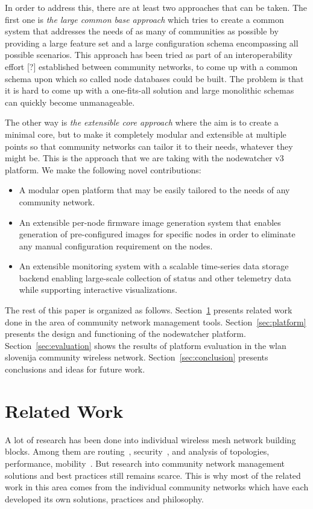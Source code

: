 \documentclass[5p,sort&compress]{elsarticle}
\begin{document}
In order to address this, there are at least two approaches that can be taken.
The first one is \textit{the large common base approach} which tries to create a common system that addresses the needs of as many of communities as possible by providing a large feature set and a large configuration schema encompassing all possible scenarios.
This approach has been tried as part of an interoperability effort [?] established between community networks, to come up with a common schema upon which so called node databases could be built.
The problem is that it is hard to come up with a one-fits-all solution and large monolithic schemas can quickly become unmanageable.

The other way is \textit{the extensible core approach} where the aim is to create a minimal core, but to make it completely modular and extensible at multiple points so that community networks can tailor it to their needs, whatever they might be.
This is the approach that we are taking with the nodewatcher v3 platform.
We make the following novel contributions:
\begin{itemize}
\item A modular open platform that may be easily tailored to the needs of any community network.
\item An extensible per-node firmware image generation system that enables generation of pre-configured images for specific nodes in order to eliminate any manual configuration requirement on the nodes.
\item An extensible monitoring system with a scalable time-series data storage backend enabling large-scale collection of status and other telemetry data while supporting interactive visualizations.
\end{itemize}

The rest of this paper is organized as follows.
Section~\ref{sec:related-work} presents related work done in the area of community network management tools.
Section~\ref{sec:platform} presents the design and functioning of the nodewatcher platform.
Section~\ref{sec:evaluation} shows the results of platform evaluation in the wlan slovenija community wireless network.
Section~\ref{sec:conclusion} presents conclusions and ideas for future work.

\section{Related Work}
\label{sec:related-work}

A lot of research has been done into individual wireless mesh network building blocks. Among them are routing~\cite{Murray_2010,Neumann_2012}, security~\cite{Siddiqui_2007}, and analysis of topologies, performance, mobility~\cite{Vega_2012,Zakrzewska_2008}.
But research into community network management solutions and best practices still remains scarce.
This is why most of the related work in this area comes from the individual community networks which have each developed its own solutions, practices and philosophy.
\end{document}
